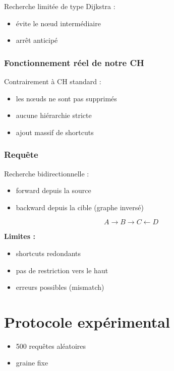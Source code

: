 \documentclass[11pt]{article}
\begin{document}
Recherche limitée de type Dijkstra :
\begin{itemize}
\item évite le nœud intermédiaire
\item arrêt anticipé
\end{itemize}

\subsubsection{Fonctionnement réel de notre CH}

Contrairement à CH standard :

\begin{itemize}
\item les nœuds ne sont pas supprimés
\item aucune hiérarchie stricte
\item ajout massif de shortcuts
\end{itemize}

\subsubsection{Requête}

Recherche bidirectionnelle :

\begin{itemize}
\item forward depuis la source
\item backward depuis la cible (graphe inversé)
\end{itemize}

\[
A \rightarrow B \rightarrow C \leftarrow D
\]

\textbf{Limites :}

\begin{itemize}
\item shortcuts redondants
\item pas de restriction vers le haut
\item erreurs possibles (mismatch)
\end{itemize}

\section{Protocole expérimental}

\begin{itemize}
\item 500 requêtes aléatoires
\item graine fixe
\end{itemize}
\end{document}
